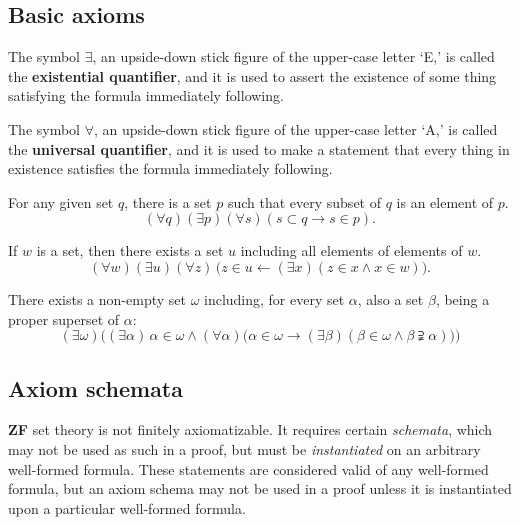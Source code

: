 \documentclass[letterpaper]{article}
\begin{document}
\subsection{Basic axioms}\label{sect-zf-axioms}
\begin{definition}
	The symbol $\exists$, an upside-down stick figure of the upper-case letter `E,' is called the \textbf{existential quantifier}, and it is used to assert the existence of some thing satisfying the  formula immediately following.
\end{definition}
\begin{definition}
	The symbol $\forall$, an upside-down stick figure of the upper-case letter `A,' is called the \textbf{universal quantifier}, and it is used to make a statement that every thing in existence satisfies the formula immediately following. 
\end{definition}
\begin{axiom}\label{powerset}
	For any given set $q$, there is a set $p$ such that every subset of $q$ is an element of $p$.
	\begin{equation}
	(\forall q)(\exists p)(\forall s)(s\subset q\longrightarrow s\in p).
	\end{equation}
\end{axiom}
\begin{axiom}[Union]\label{unionset}
	If $w$ is a set, then there exists a set $u$ including all elements of elements of $w$.
	\begin{equation}
	(\forall w)(\exists u)(\forall z)\,\big(z\in u\longleftarrow(\exists x)(z\in x\land x\in w)\big).
	\end{equation}
\end{axiom}
\begin{axiom}[Infinity] \label{infinityset}
	There exists a non-empty set $\omega$ including, for every set $\alpha$, also a set $\beta$, being a proper superset of $\alpha$:
	\begin{equation}
	(\exists \omega)\bigg((\exists \alpha)\, \alpha\in \omega\land (\forall \alpha)\big(\alpha\in \omega\longrightarrow (\exists\beta)(\beta\in\omega\land\beta\supsetneqq\alpha)\big)\bigg)
	\end{equation}
\end{axiom}
\subsection{Axiom schemata}\label{zf-sect-schemata}
\textbf{ZF} set theory is not finitely axiomatizable.  It requires certain \textit{schemata}, which may not be used as such in a proof, but must be \textit{instantiated} on an arbitrary well-formed formula.  These statements are considered valid of any well-formed formula, but an axiom schema may not be used in a proof unless it is instantiated upon a particular well-formed formula.
\end{document}
